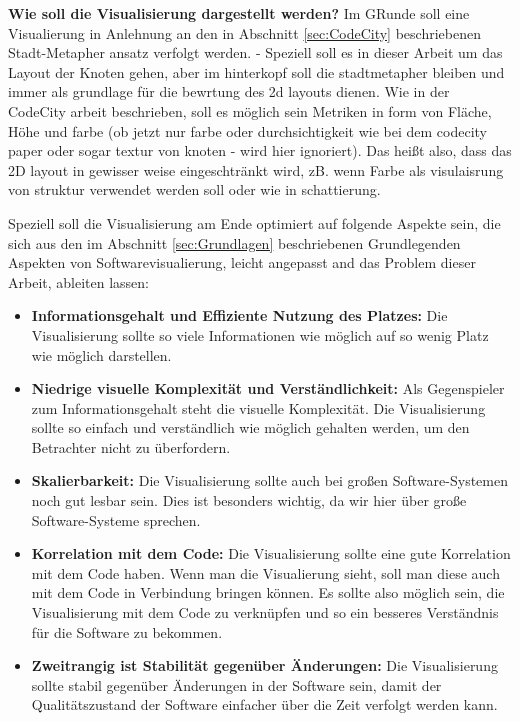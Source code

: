 \textbf{Wie soll die Visualisierung dargestellt werden?}
Im GRunde soll eine Visualierung in Anlehnung an den in Abschnitt \ref{sec:CodeCity} beschriebenen Stadt-Metapher ansatz verfolgt werden. - Speziell soll es in dieser Arbeit um das Layout der Knoten gehen, aber im hinterkopf soll die stadtmetapher bleiben und immer als grundlage für die bewrtung des 2d layouts dienen. 
Wie in der CodeCity arbeit beschrieben, soll es möglich sein Metriken in form von Fläche, Höhe und farbe (ob jetzt nur farbe oder durchsichtigkeit wie bei dem codecity paper oder sogar textur von knoten - wird hier ignoriert). Das heißt also, dass das 2D layout in gewisser weise eingeschtränkt wird, zB. wenn Farbe als visulaisrung von struktur verwendet werden soll oder wie in \cite{bruls2000squarified} schattierung.

Speziell soll die Visualisierung am Ende optimiert auf folgende Aspekte sein, die sich aus den im Abschnitt \ref{sec:Grundlagen} beschriebenen Grundlegenden Aspekten von Softwarevisualierung, leicht angepasst and das Problem dieser Arbeit, ableiten lassen: 

\begin{itemize}
    \item \textbf{Informationsgehalt und Effiziente Nutzung des Platzes:} Die Visualisierung sollte so viele Informationen wie möglich auf so wenig Platz wie möglich darstellen.
    \item \textbf{Niedrige visuelle Komplexität und Verständlichkeit:} Als Gegenspieler zum Informationsgehalt steht die visuelle Komplexität. Die Visualisierung sollte so einfach und verständlich wie möglich gehalten werden, um den Betrachter nicht zu überfordern.
    \item \textbf{Skalierbarkeit:} Die Visualisierung sollte auch bei großen Software-Systemen noch gut lesbar sein. Dies ist besonders wichtig, da wir hier über große Software-Systeme sprechen.
    \item \textbf{Korrelation mit dem Code:} Die Visualisierung sollte eine gute Korrelation mit dem Code haben. Wenn man die Visualierung sieht, soll man diese auch mit dem Code in Verbindung bringen können. Es sollte also möglich sein, die Visualisierung mit dem Code zu verknüpfen und so ein besseres Verständnis für die Software zu bekommen.
    \item \textbf{Zweitrangig ist Stabilität gegenüber Änderungen:} Die Visualisierung sollte stabil gegenüber Änderungen in der Software sein, damit der Qualitätszustand der Software einfacher über die Zeit verfolgt werden kann.
\end{itemize}

